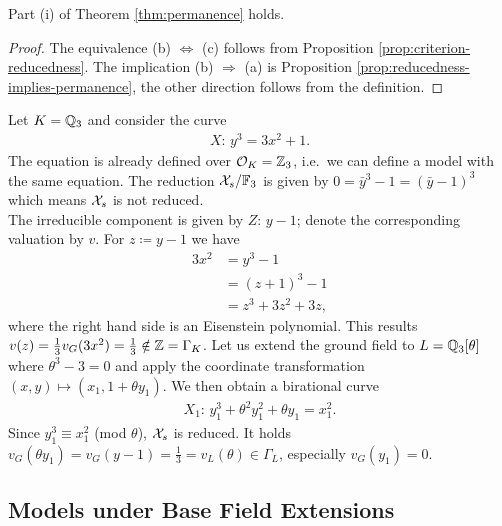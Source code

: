 \begin{corollary} \label{cor:permanence-part-i}
    Part (i) of Theorem \ref{thm:permanence} holds.
\end{corollary}

\begin{proof}
    The equivalence (b) $\iff$ (c) follows from Proposition \ref{prop:criterion-reducedness}.
    The implication (b) $\Rightarrow$ (a) is Proposition \ref{prop:reducedness-implies-permanence}, the other direction follows from the definition.
\end{proof}


\begin{example}
    Let $K = \mathbb Q_3$ and consider the curve
    \begin{align}
        X: \, y^3 = 3x^2 + 1.
    \end{align}
    The equation is already defined over $\mathcal O_K = \mathbb Z_3$, i.e.\ we can define a model with the same equation.
    The reduction $\mathcal X_s/\mathbb F_3$ is given by $0 = \bar{y}^3 - 1 = (\bar{y} - 1)^3$ which means $\mathcal X_s$ is not reduced. \\
    The irreducible component is given by $Z: \, y-1$; denote the corresponding valuation by $v$.
    For $z \coloneqq y - 1$ we have
    \begin{align*}
        3x^2 &= y^3 - 1 \\
            &= (z+1)^3 - 1 \\
            &= z^3 + 3z^2 + 3z,
    \end{align*}
    where the right hand side is an Eisenstein polynomial.
    This results $v(z) = \frac{1}{3}v_G(3x^2) = \frac{1}{3} \notin \mathbb Z = \Gamma_K$.
    Let us extend the ground field to $L = \mathbb Q_3[\theta]$ where $\theta^3 - 3 = 0$ and apply the coordinate transformation
    $(x,y) \mapsto (x_1, 1+ \theta y_1)$.
    We then obtain a birational curve
    \begin{align}
        X_1: \, y_1^3 + \theta^2 y_1^2 + \theta y_1 = x_1^2.
    \end{align}
    Since $y_1^3 \equiv x_1^2$ (mod $\theta$), $\mathcal X_s$ is reduced.
    It holds $v_G(\theta y_1) = v_G(y - 1) = \frac{1}{3} = v_L(\theta) \in \Gamma_L$, especially $v_G(y_1) = 0$.
\end{example}


\subsection{Models under Base Field Extensions}\label{subsec:models-under-base-field-extensions}


